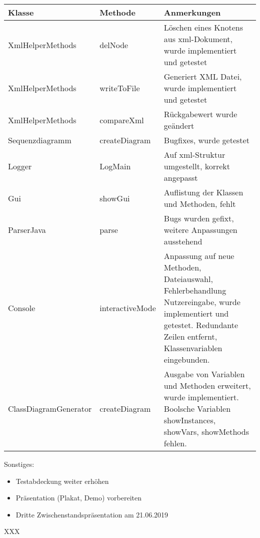 \begin{table}[H]

\begin{tabularx}{\textwidth}{ |l|l|X| }
\hline
\textbf{Klasse} & \textbf{Methode} & \textbf{Anmerkungen}\\
 \hline
XmlHelperMethods & delNode & Löschen eines Knotens aus xml-Dokument, wurde implementiert und getestet\\ \hline
XmlHelperMethods & writeToFile & Generiert XML Datei, wurde implementiert und getestet\\ \hline
XmlHelperMethods & compareXml & Rückgabewert wurde geändert \\ \hline
Sequenzdiagramm & createDiagram & Bugfixes, wurde getestet\\\hline
Logger & LogMain & Auf xml-Struktur umgestellt, korrekt angepasst\\\hline
Gui & showGui & Auflistung der Klassen und Methoden, fehlt\\\hline
ParserJava & parse & Bugs wurden gefixt, weitere Anpassungen ausstehend \\ \hline
Console & interactiveMode & Anpassung auf neue Methoden, Dateiauswahl, Fehlerbehandlung Nutzereingabe, wurde implementiert und getestet. Redundante Zeilen entfernt, Klassenvariablen eingebunden. \\ \hline
ClassDiagramGenerator & createDiagram & Ausgabe von Variablen und Methoden erweitert, wurde implementiert. Boolsche Variablen showInstances, showVars, showMethods fehlen.\\ \hline
\end{tabularx}
\end{table}

Sonstiges:
\begin{itemize}
\item Testabdeckung weiter erhöhen
\item Präsentation (Plakat, Demo) vorbereiten
\item Dritte Zwischenstandspräsentation am 21.06.2019
\end{itemize}
\nsecend%


\nsecend%

XXX
\nsecend%

